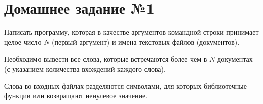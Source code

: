 \section*{Домашнее задание №1}

Написать программу, которая в качестве аргументов командной строки
принимает целое число $N$ (первый аргумент) и имена текстовых файлов
(документов).

Необходимо вывести все слова, которые встречаются более
чем в $N$ документах (с указанием количества вхождений каждого слова).

Слова во входных файлах разделяются символами, для которых
библиотечные функции  или  возвращают ненулевое
значение.
